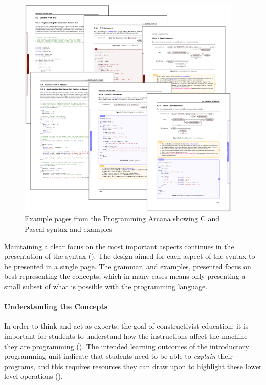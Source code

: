\begin{figure}[h]
  \centering
  \includegraphics[width=0.95\textwidth]{ArcanaSyntax}
  \caption{Example pages from the Programming Arcana showing C and Pascal syntax and examples}
  \label{fig:arcana_syntax}
\end{figure}

Maintaining a clear focus on the most important aspects continues in the presentation of the syntax (). The design aimed for each aspect of the syntax to be presented in a single page. The grammar, and examples, presented focus on best representing the concepts, which in many cases means only presenting a small subset of what is possible with the programming language. 


\paragraph{Understanding the Concepts} %
\label{par:understanding_the_concepts_}

In order to think and act as experts, the goal of constructivist education, it is important for students to understand how the instructions affect the machine they are programming (). The intended learning outcomes of the introductory programming unit indicate that students need to be able to \emph{explain} their programs, and this requires resources they can draw upon to highlight these lower level operations ().

